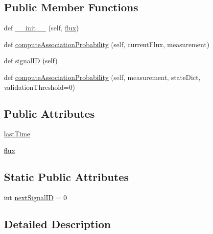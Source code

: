 \subsection*{Public Member Functions}
\begin{DoxyCompactItemize}
\item 
def \hyperlink{classmodest_1_1signals_1_1poissonsource_1_1PoissonSource_a99a01c192bed30cb9f8a08d1a1ee8706}{\+\_\+\+\_\+init\+\_\+\+\_\+} (self, \hyperlink{classmodest_1_1signals_1_1poissonsource_1_1PoissonSource_a6f2c657ad936b921715d826ac74f7fe5}{flux})
\item 
def \hyperlink{classmodest_1_1signals_1_1poissonsource_1_1PoissonSource_a2f8a73e6f51cbdcd0f1e646d6f4d4574}{compute\+Association\+Probability} (self, current\+Flux, measurement)
\item 
def \hyperlink{classmodest_1_1signals_1_1signalsource_1_1SignalSource_a9a64c6a9c2954f6ad61e4ca3518ea8ab}{signal\+ID} (self)
\item 
def \hyperlink{classmodest_1_1signals_1_1signalsource_1_1SignalSource_a3d32dbed840ea9ac775b226f0a654831}{compute\+Association\+Probability} (self, measurement, state\+Dict, validation\+Threshold=0)
\end{DoxyCompactItemize}
\subsection*{Public Attributes}
\begin{DoxyCompactItemize}
\item 
\hyperlink{classmodest_1_1signals_1_1poissonsource_1_1PoissonSource_a34395fc83bd8743a0a5ee69f9392a606}{last\+Time}
\item 
\hyperlink{classmodest_1_1signals_1_1poissonsource_1_1PoissonSource_a6f2c657ad936b921715d826ac74f7fe5}{flux}
\end{DoxyCompactItemize}
\subsection*{Static Public Attributes}
\begin{DoxyCompactItemize}
\item 
int \hyperlink{classmodest_1_1signals_1_1signalsource_1_1SignalSource_a453eafb550b551adbec0903deb63dfce}{next\+Signal\+ID} = 0
\end{DoxyCompactItemize}


\subsection{Detailed Description}


